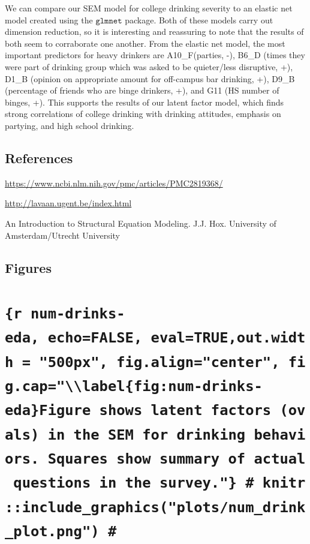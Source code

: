 \documentclass[]{article}
\begin{document}
We can compare our SEM model for college drinking severity to an elastic
net model created using the \(\texttt{glmnet}\) package. Both of these
models carry out dimension reduction, so it is interesting and
reassuring to note that the results of both seem to corraborate one
another. From the elastic net model, the most important predictors for
heavy drinkers are A10\_F(parties, -), B6\_D (times they were part of
drinking group which was asked to be quieter/less disruptive, +), D1\_B
(opinion on appropriate amount for off-campus bar drinking, +), D9\_B
(percentage of friends who are binge drinkers, +), and G11 (HS number of
binges, +). This supports the results of our latent factor model, which
finds strong correlations of college drinking with drinking attitudes,
emphasis on partying, and high school drinking.

\hypertarget{references}{%
\subsection{References}\label{references}}

\url{https://www.ncbi.nlm.nih.gov/pmc/articles/PMC2819368/}

\url{http://lavaan.ugent.be/index.html}

An Introduction to Structural Equation Modeling. J.J. Hox. University of
Amsterdam/Utrecht University

\hypertarget{figures}{%
\subsection{Figures}\label{figures}}

\hypertarget{r-num-drinks-eda-echofalse-evaltrueout.width-500px-fig.aligncenter-fig.caplabelfignum-drinks-edafigure-shows-latent-factors-ovals-in-the-sem-for-drinking-behaviors.-squares-show-summary-of-actual-questions-in-the-survey.-knitrinclude_graphicsplotsnum_drink_plot.png}{%
\section{\texorpdfstring{\texttt{\{r\ num-drinks-eda,\ echo=FALSE,\ eval=TRUE,out.width\ =\ "500px",\ fig.align="center",\ fig.cap="\textbackslash{}\textbackslash{}label\{fig:num-drinks-eda\}Figure\ shows\ latent\ factors\ (ovals)\ in\ the\ SEM\ for\ drinking\ behaviors.\ Squares\ show\ summary\ of\ actual\ questions\ in\ the\ survey."\}\ \#\ knitr::include\_graphics("plots/num\_drink\_plot.png")\ \#}}{\{r num-drinks-eda, echo=FALSE, eval=TRUE,out.width = "500px", fig.align="center", fig.cap="\textbackslash{}\textbackslash{}label\{fig:num-drinks-eda\}Figure shows latent factors (ovals) in the SEM for drinking behaviors. Squares show summary of actual questions in the survey."\} \# knitr::include\_graphics("plots/num\_drink\_plot.png") \#}}\label{r-num-drinks-eda-echofalse-evaltrueout.width-500px-fig.aligncenter-fig.caplabelfignum-drinks-edafigure-shows-latent-factors-ovals-in-the-sem-for-drinking-behaviors.-squares-show-summary-of-actual-questions-in-the-survey.-knitrinclude_graphicsplotsnum_drink_plot.png}}
\end{document}
